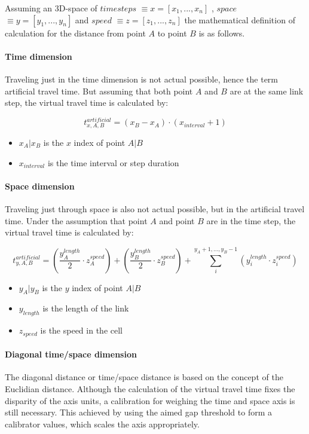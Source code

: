 \documentclass[a4paper,headsepline,footsepline,fontsize=11pt,BCOR=12mm,DIV=12]{report}
\begin{document}
Assuming an 3D-space of $time steps$ $\equiv x=[x_1,...,x_n]$ , $space$ $\equiv y=[y_1,...,y_n]$ and $speed$ $\equiv z=[z_1,...,z_n]$ the mathematical definition of calculation for the distance from point $A$ to point $B$ is as follows.

\paragraph{Time dimension} Traveling just in the time dimension is not actual possible, hence the term artificial travel time. But assuming that both point $A$ and $B$ are at the same link step, the virtual travel time is calculated by:

\begin{equation}
	t_{x,A,B}^{artificial} = (x_B - x_A) \cdot ( x_{interval} + 1 )
	\label{equation_t_v_time}
\end{equation}

\begin{itemize}
	\setlength\itemsep{0.1em}	
	\item[] $x_A | x_B$ is the $x$ index of point $A | B$
	\item[] $x_{interval}$ is the time interval or step duration
\end{itemize}

\paragraph{Space dimension} Traveling just through space is also not actual possible, but in the artificial travel time. Under the assumption that point $A$ and point $B$ are in the time step, the virtual travel time is calculated by:  

\begin{equation}
	t_{y,A,B}^{artificial} = (\frac{y_{A}^{length}}{2}  \cdot z_{A}^{speed}) + (\frac{y_{B}^{length}}{2} \cdot z_{B}^{speed}) + \sum_{i}^{y_A + 1,...,y_B - 1} (y_{i}^{length} \cdot z_{i}^{speed})
\end{equation}

\begin{itemize}
	\setlength\itemsep{0.1em}	
	\item[] $y_A | y_B$ is the $y$ index of point $A | B$
	\item[] $y_{length}$ is the length of the link
	\item[] $z_{speed}$ is the speed in the cell
\end{itemize}

\paragraph{Diagonal time/space dimension} The diagonal distance or time/space distance is based on the concept of the Euclidian distance. Although the calculation of the virtual travel time fixes the disparity of the axis units, a calibration for weighing the time and space axis is still necessary. This achieved by using the aimed gap threshold to form a calibrator values, which scales the axis appropriately.
\end{document}
